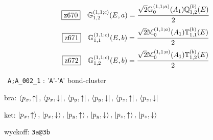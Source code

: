 \documentclass[fleqn,10pt,landscape]{jsarticle}
\begin{document}
\begin{dmath*}
\hspace*{3mm}\fbox{z670}\quad \mathbb{G}_{1,2}^{(1,1;c)}(E,a)=\frac{\sqrt{2} \mathbb{G}_{0}^{(1,1;a)}(A_{1}) \mathbb{Q}_{1,2}^{(b)}(E)}{2}
\end{dmath*}
\begin{dmath*}
\hspace*{3mm}\fbox{z671}\quad \mathbb{G}_{1,1}^{(1,1;c)}(E,b)=\frac{\sqrt{2} \mathbb{M}_{0}^{(1,1;a)}(A_{1}) \mathbb{T}_{1,1}^{(b)}(E)}{2}
\end{dmath*}
\begin{dmath*}
\hspace*{3mm}\fbox{z672}\quad \mathbb{G}_{1,2}^{(1,1;c)}(E,b)=\frac{\sqrt{2} \mathbb{M}_{0}^{(1,1;a)}(A_{1}) \mathbb{T}_{1,2}^{(b)}(E)}{2}
\end{dmath*}
\vspace{5mm}

\noindent\textbullet\, \texttt{A;A_002_1} : '\texttt{A}'-'\texttt{A}' bond-cluster

\noindent\quad * bra: $\bra{p_{x},\uparrow},\, \bra{p_{x},\downarrow},\, \bra{p_{y},\uparrow},\, \bra{p_{y},\downarrow},\, \bra{p_{z},\uparrow},\, \bra{p_{z},\downarrow}$

\noindent\quad * ket: $\ket{p_{x},\uparrow},\, \ket{p_{x},\downarrow},\, \ket{p_{y},\uparrow},\, \ket{p_{y},\downarrow},\, \ket{p_{z},\uparrow},\, \ket{p_{z},\downarrow}$

\noindent\quad * wyckoff: \texttt{3a@3b}
\end{document}
